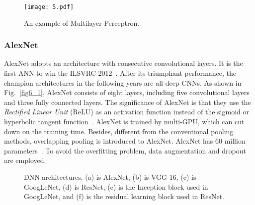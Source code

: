 \begin{figure}[htbp!]
\centering
\texttt{[image: 5.pdf]}
\caption{An example of Multilayer Perceptron.}
\label{fig5}
\end{figure}

\subsubsection{AlexNet}
\label{AlexNet}
AlexNet adopts an architecture with consecutive convolutional layers. It is the first ANN to win the ILSVRC 2012~\cite{Rahaman-2020-ASCC}. After its triumphant performance, the champion architectures in the following years are all deep CNNs. As shown in Fig.~\ref{fig6_1}, AlexNet consists of eight layers, including five convolutional layers and three fully connected layers. The significance of AlexNet is that they use the \emph{Rectified Linear Unit} (ReLU) as an activation function instead of the sigmoid or hyperbolic tangent function~\cite{Rahaman-2020-ASCC}. AlexNet is trained by multi-GPU, which can cut down on the training time. Besides, different from the conventional pooling methods, overlapping pooling is introduced to AlexNet. AlexNet has 60 million parameters~\cite{Russakovsky-2015-ILSV}. To avoid the overfitting problem, data augmentation and dropout are employed.

\begin{figure}[htbp!]
\centering  
{}
\caption{DNN architectures. (a) is AlexNet, (b) is VGG-16, (c) is GoogLeNet, (d) is ResNet, (e) is the Inception block used in GoogLeNet, and (f) is the residual learning block used in ResNet.}
\label{fig6}
\end{figure}




